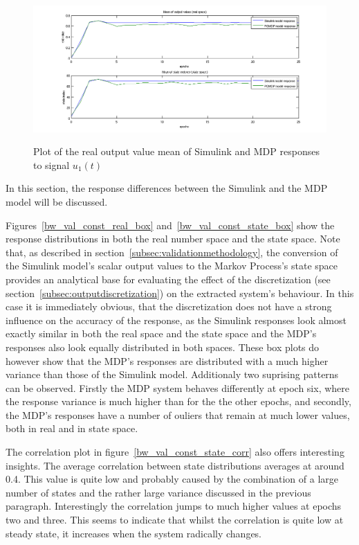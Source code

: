 \begin{figure}
\begin{center}
\includegraphics[width=18cm]{media/bw/bw_val_const_real_mean}\\
\end{center}
\caption{Plot of the real output value mean of Simulink and MDP responses to signal $u_1(t)$}
\label{bw_val_const_real_mean}
\end{figure}

In this section, the response differences between the Simulink and the MDP model will be discussed.

Figures~\ref{bw_val_const_real_box} and~\ref{bw_val_const_state_box} show the response distributions in both the real number space and the state space. Note that, as described in section~\ref{subsec:validationmethodology}, the conversion of the Simulink model's scalar output values to the Markov Process's state space provides an analytical base for evaluating the effect of the discretization (see section~\ref{subsec:outputdiscretization}) on the extracted system's behaviour. In this case it is immediately obvious, that the discretization does not have a strong influence on the accuracy of the response, as the Simulink responses look almost exactly similar in both the real space and the state space and the MDP's responses also look equally distributed in both spaces. These box plots do however show that the MDP's responses are distributed with a much higher variance than those of the Simulink model. Additionaly two suprising patterns can be observed. Firstly the MDP system behaves differently at epoch six, where the response variance is much higher than for the the other epochs, and secondly, the MDP's responses have a number of ouliers that remain at much lower values, both in real and in state space.

The correlation plot in figure~\ref{bw_val_const_state_corr} also offers interesting insights. The average correlation between state distributions averages at around 0.4. This value is quite low and probably caused by the combination of a large number of states and the rather large variance discussed in the previous paragraph. Interestingly the correlation jumps to much higher values at epochs two and three. This seems to indicate that whilst the correlation is quite low at steady state, it increases when the system radically changes.

